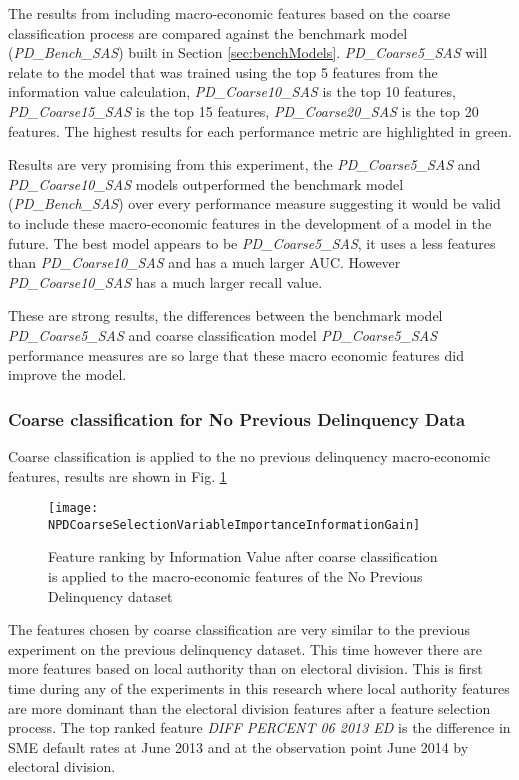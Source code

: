 The results from including macro-economic features based on the coarse classification process are compared against the benchmark model (\textit{PD\_Bench\_SAS}) built in Section \ref{sec:benchModels}. \textit{PD\_Coarse5\_SAS} will relate to the model that was trained using the top 5 features from the information value calculation, \textit{PD\_Coarse10\_SAS} is the top 10 features, \textit{PD\_Coarse15\_SAS} is the top 15 features, \textit{PD\_Coarse20\_SAS} is the top 20 features. The highest results for each performance metric are highlighted in green.

Results are very promising from this experiment, the \textit{PD\_Coarse5\_SAS} and \textit{PD\_Coarse10\_SAS} models outperformed the benchmark model (\textit{PD\_Bench\_SAS}) over every performance measure suggesting it would be valid to include these macro-economic features in the development of a model in the future. The best model appears to be \textit{PD\_Coarse5\_SAS}, it uses a less features than \textit{\textit{PD\_Coarse10\_SAS}} and has a much larger AUC. However \textit{PD\_Coarse10\_SAS} has a much larger recall value. 

These are strong results, the differences between the benchmark model \textit{PD\_Coarse5\_SAS} and coarse classification model \textit{PD\_Coarse5\_SAS} performance measures are so large that these macro economic features did improve the model.


\subsubsection{Coarse classification for No Previous Delinquency Data}

Coarse classification is applied to the no previous delinquency macro-economic features, results are shown in Fig. \ref{fig:NPDCoarseSelectionVariableImportanceInformationGain}

\begin{figure}[H]
	\texttt{[image: NPDCoarseSelectionVariableImportanceInformationGain]}
	\caption{Feature ranking by Information Value after coarse classification \\is applied to the macro-economic features of the No Previous Delinquency dataset}
	\label{fig:NPDCoarseSelectionVariableImportanceInformationGain}
\end{figure}


The features chosen by coarse classification are very similar to the previous experiment on the previous delinquency dataset. This time however there are more features based on local authority than on electoral division. This is first time during any of the experiments in this research where local authority features are more dominant than the electoral division features after a feature selection process. The top ranked feature \textit{DIFF PERCENT 06 2013 ED} is the difference in SME default rates at June 2013 and at the observation point June 2014 by electoral division. 

